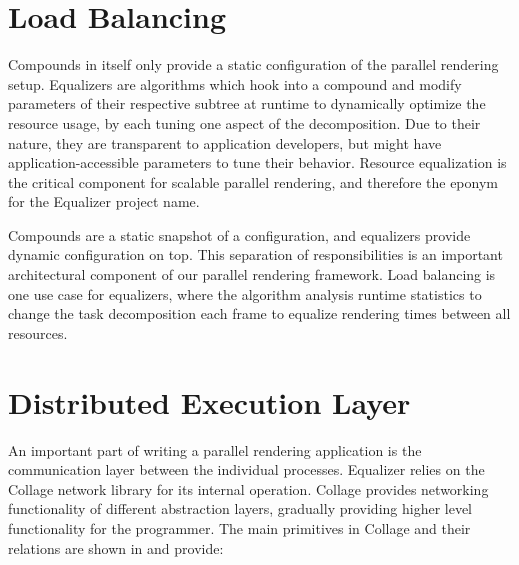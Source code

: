 \section{Load Balancing}

Compounds in itself only provide a static configuration of the parallel
rendering setup. \textsf{Equalizers} are algorithms which hook into a compound
and modify parameters of their respective subtree at runtime to dynamically
optimize the resource usage, by each tuning one aspect of the decomposition. Due
to their nature, they are transparent to application developers, but might have
application-accessible parameters to tune their behavior. Resource equalization
is the critical component for scalable parallel rendering, and therefore the
eponym for the \textsf{Equalizer} project name.

Compounds are a static snapshot of a configuration, and equalizers provide
dynamic configuration on top. This separation of responsibilities is an
important architectural component of our parallel rendering framework. Load
balancing is one use case for equalizers, where the algorithm analysis runtime
statistics to change the task decomposition each frame to equalize rendering
times between all resources.

\section{Distributed Execution Layer}

An important part of writing a parallel rendering application is the
communication layer between the individual processes. \textsf{Equalizer} relies
on the \textsf{Collage} network library for its internal operation.
\textsf{Collage} provides networking functionality of different abstraction
layers, gradually providing higher level functionality for the programmer. The
main primitives in \textsf{Collage} and their relations are shown in
 and provide:

